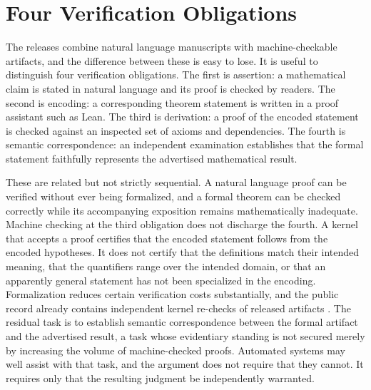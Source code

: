 \documentclass[12pt]{article}
\begin{document}
\section{Four Verification Obligations}

The releases combine natural language manuscripts with machine-checkable artifacts, and the difference between these is easy to lose. It is useful to distinguish four verification obligations. The first is assertion: a mathematical claim is stated in natural language and its proof is checked by readers. The second is encoding: a corresponding theorem statement is written in a proof assistant such as Lean. The third is derivation: a proof of the encoded statement is checked against an inspected set of axioms and dependencies. The fourth is semantic correspondence: an independent examination establishes that the formal statement faithfully represents the advertised mathematical result.

These are related but not strictly sequential. A natural language proof can be verified without ever being formalized, and a formal theorem can be checked correctly while its accompanying exposition remains mathematically inadequate. Machine checking at the third obligation does not discharge the fourth. A kernel that accepts a proof certifies that the encoded statement follows from the encoded hypotheses. It does not certify that the definitions match their intended meaning, that the quantifiers range over the intended domain, or that an apparently general statement has not been specialized in the encoding. Formalization reduces certain verification costs substantially, and the public record already contains independent kernel re-checks of released artifacts \cite{openai-first-look}. The residual task is to establish semantic correspondence between the formal artifact and the advertised result, a task whose evidentiary standing is not secured merely by increasing the volume of machine-checked proofs. Automated systems may well assist with that task, and the argument does not require that they cannot. It requires only that the resulting judgment be independently warranted.
\end{document}
